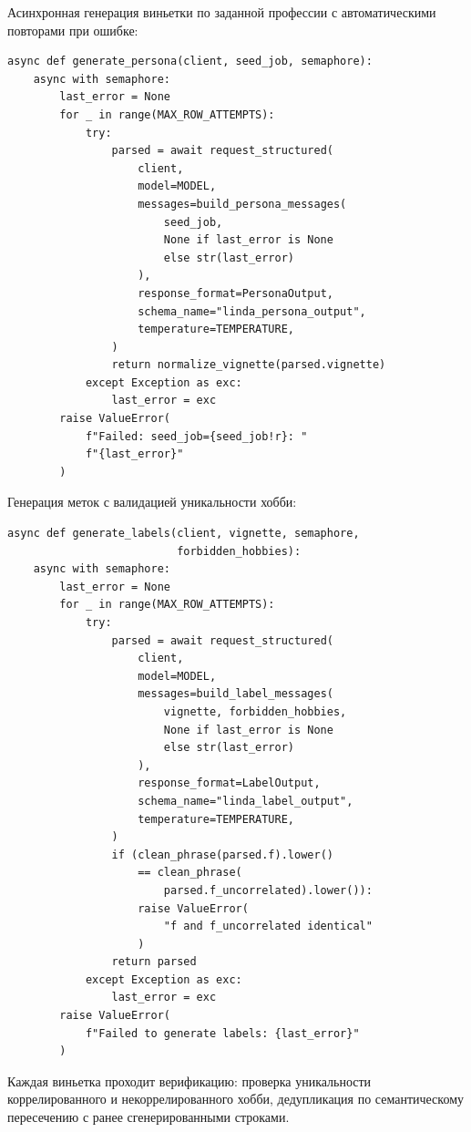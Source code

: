 Асинхронная генерация виньетки по заданной профессии с автоматическими повторами при ошибке:

\begin{lstlisting}
async def generate_persona(client, seed_job, semaphore):
    async with semaphore:
        last_error = None
        for _ in range(MAX_ROW_ATTEMPTS):
            try:
                parsed = await request_structured(
                    client,
                    model=MODEL,
                    messages=build_persona_messages(
                        seed_job,
                        None if last_error is None
                        else str(last_error)
                    ),
                    response_format=PersonaOutput,
                    schema_name="linda_persona_output",
                    temperature=TEMPERATURE,
                )
                return normalize_vignette(parsed.vignette)
            except Exception as exc:
                last_error = exc
        raise ValueError(
            f"Failed: seed_job={seed_job!r}: "
            f"{last_error}"
        )
\end{lstlisting}

Генерация меток с валидацией уникальности хобби:

\begin{lstlisting}
async def generate_labels(client, vignette, semaphore,
                          forbidden_hobbies):
    async with semaphore:
        last_error = None
        for _ in range(MAX_ROW_ATTEMPTS):
            try:
                parsed = await request_structured(
                    client,
                    model=MODEL,
                    messages=build_label_messages(
                        vignette, forbidden_hobbies,
                        None if last_error is None
                        else str(last_error)
                    ),
                    response_format=LabelOutput,
                    schema_name="linda_label_output",
                    temperature=TEMPERATURE,
                )
                if (clean_phrase(parsed.f).lower()
                    == clean_phrase(
                        parsed.f_uncorrelated).lower()):
                    raise ValueError(
                        "f and f_uncorrelated identical"
                    )
                return parsed
            except Exception as exc:
                last_error = exc
        raise ValueError(
            f"Failed to generate labels: {last_error}"
        )
\end{lstlisting}

Каждая виньетка проходит верификацию: проверка уникальности коррелированного и некоррелированного хобби, дедупликация по семантическому пересечению с ранее сгенерированными строками.
